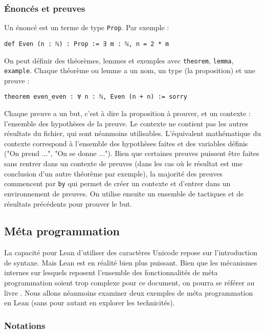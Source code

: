 \documentclass[a4paper, 12pt]{article}
\newcommand{\lean}[1]{\texttt{#1}}
\begin{document}
\subsubsection{Énoncés et preuves}

Un énoncé est un terme de type \lean{Prop}. Par exemple :

\begin{verbatim}
def Even (n : ℕ) : Prop := ∃ m : ℕ, n = 2 * m
\end{verbatim}

On peut définir des théorèmes, lemmes et exemples avec \lean{theorem}, \lean{lemma}, \lean{example}. Chaque théorème ou lemme a un nom, un type (la proposition) et une preuve :

\begin{verbatim}
theorem even_even : ∀ n : ℕ, Even (n + n) := sorry
\end{verbatim}

Chaque preuve a un but, c'est à dire la proposition à prouver, et un contexte : l'ensemble des hypothèses de la preuve. Le contexte ne contient pas les autres résultats du fichier, qui sont néanmoins utilisables. L'équivalent mathématique du contexte correspond à l'ensemble des hypothèses faites et des variables définis ("On prend ...", "On se donne ..."). Bien que certaines preuves puissent être faites sans rentrer dans un contexte de preuves (dans les cas où le résultat est une conclusion d'un autre théorème par exemple), la majorité des preuves commencent par \lean{by} qui permet de créer un contexte et d'entrer dans un environnement de preuves. On utilise ensuite un ensemble de tactiques et de résultats précédents pour prouver le but.


\subsection{Méta programmation}

La capacité pour Lean d'utiliser des caractères Unicode repose sur l'introduction de syntaxe. Mais Lean est en réalité bien plus puissant. Bien que les mécanismes internes sur lesquels reposent l'ensemble des fonctionnalités de méta programmation soient trop complexe pour ce document, on pourra se référer au livre \cite{meta_lean}. Nous allons néanmoins examiner deux exemples de méta programmation en Lean (sans pour autant en explorer les technicités).

\subsubsection{Notations}
\end{document}
